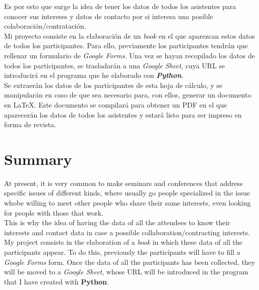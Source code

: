 \documentclass[a4paper, 12pt]{book}
\begin{document}
Es por esto que surge la idea de tener los datos de todos los asistentes para conocer sus intereses y datos de contacto por si interesa una posible colaboración/contratación.\\

Mi proyecto consiste en la elaboración de un \textit{book} en el que aparezcan estos datos de todos los participantes. Para ello, previamente los participantes tendrán que rellenar un formulario de \textit{Google Forms}. Una vez se hayan recopilado los datos de todos los participantes, se trasladarán a una \textit{Google Sheet}, cuya URL se introducirá en el programa que he elaborado con \textbf{\textit{Python}}.\\

Se extraerán los datos de los participantes de esta hoja de cálculo, y se manipularán en caso de que sea necesario para, con ellos, generar un documento en \LaTeX. Este documento se compilará para obtener un PDF en el que aparecerán los datos de todos los asistentes y estará listo para ser impreso en forma de revista.



\chapter*{Summary}

At present, it is very common to make seminars and conferences that address specific issues of different kinds, where usually go people specialized in the issue whobe willing to meet other people who share their same interests, even looking for people with those that work.\\

This is why the idea of having the data of all the attendees to know their interests and contact data in case a possible collaboration/contracting interests.\\

My project consists in the elaboration of a \textit{book} in which these data of all the participants appear. To do this, previously the participants will have to fill a \textit{Google Forms} form. Once the data of all the participants has been collected, they will be moved to a \textit{Google Sheet}, whose URL will be introduced in the program that I have created with \textbf{Python}.\\
\end{document}
